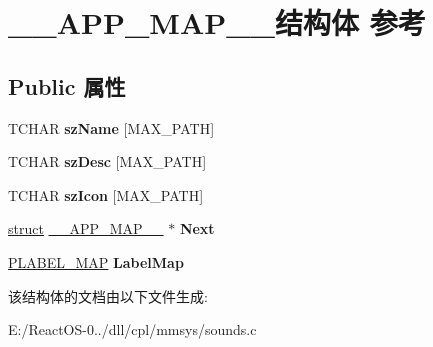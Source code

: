 \hypertarget{struct_____a_p_p___m_a_p____}{}\section{\+\_\+\+\_\+\+A\+P\+P\+\_\+\+M\+A\+P\+\_\+\+\_\+结构体 参考}
\label{struct_____a_p_p___m_a_p____}
\subsection*{Public 属性}
\begin{DoxyCompactItemize}
\item 
\mbox{\label{struct_____a_p_p___m_a_p_____a3b47420aafaf2323ea692f79df9bb31f}} 
T\+C\+H\+AR {\bfseries sz\+Name} \mbox{[}M\+A\+X\+\_\+\+P\+A\+TH\mbox{]}
\item 
\mbox{\label{struct_____a_p_p___m_a_p_____afff7fe5a68b81eabe93b07711c4a94c8}} 
T\+C\+H\+AR {\bfseries sz\+Desc} \mbox{[}M\+A\+X\+\_\+\+P\+A\+TH\mbox{]}
\item 
\mbox{\label{struct_____a_p_p___m_a_p_____a5fae2002618b7cc45b186953d0367508}} 
T\+C\+H\+AR {\bfseries sz\+Icon} \mbox{[}M\+A\+X\+\_\+\+P\+A\+TH\mbox{]}
\item 
\mbox{\label{struct_____a_p_p___m_a_p_____acfd1f82e8a725aba6c56649d98ba3619}} 
\hyperlink{interfacestruct}{struct} \hyperlink{struct_____a_p_p___m_a_p____}{\+\_\+\+\_\+\+A\+P\+P\+\_\+\+M\+A\+P\+\_\+\+\_\+} $\ast$ {\bfseries Next}
\item 
\mbox{\label{struct_____a_p_p___m_a_p_____aab90889a9afbcd9841c7bcac1ad8a4ad}} 
\hyperlink{struct_____l_a_b_e_l___m_a_p____}{P\+L\+A\+B\+E\+L\+\_\+\+M\+AP} {\bfseries Label\+Map}
\end{DoxyCompactItemize}


该结构体的文档由以下文件生成\+:\begin{DoxyCompactItemize}
\item 
E\+:/\+React\+O\+S-\/0../dll/cpl/mmsys/sounds.\+c\end{DoxyCompactItemize}
